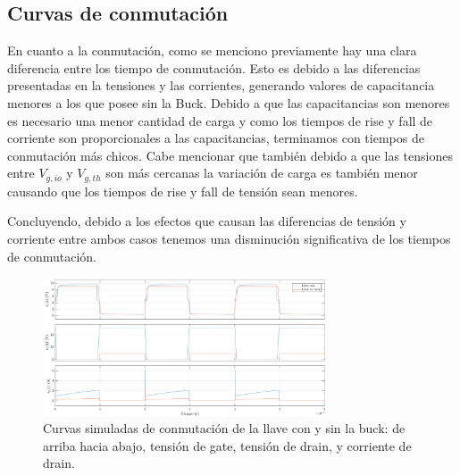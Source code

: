 \documentclass[e4_tp1_main.tex]{subfiles}
\begin{document}
\subsection{Curvas de conmutaci\'on}

En cuanto a la conmutación, como se menciono previamente hay una clara diferencia entre los tiempo de conmutación. Esto es debido a las diferencias presentadas en la tensiones y las corrientes, generando valores de capacitancia menores a los que posee sin la Buck. Debido a que las capacitancias son menores es necesario una menor cantidad de carga y como los tiempos de rise y fall de corriente son proporcionales a las capacitancias, terminamos con tiempos de conmutación más chicos. Cabe mencionar que también debido a que las  tensiones entre $V_{g,io}$ y $V_{g,th}$ son más cercanas la variación de carga es también menor causando que los tiempos de rise y fall de tensión sean menores. 

Concluyendo, debido a los efectos que causan las diferencias de tensión y corriente entre ambos casos tenemos una disminución significativa de los tiempos de conmutación.




	\begin{figure}[ht]
		\centering
		\includegraphics[width=0.75\textwidth]{images/ej3/conmutacion3.png}
		\caption{Curvas simuladas de conmutaci\'on de la llave con y sin la buck: de arriba hacia abajo, tensi\'on de gate, tensi\'on de drain, y corriente de drain.}
		\label{fig:curvas3}
	\end{figure}
\end{document}

